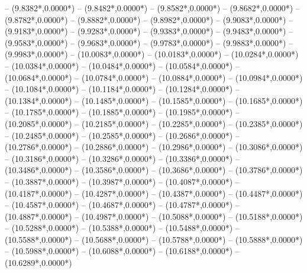 {	-- ({9.8382*\dx},{0.0000*\dy})
	-- ({9.8482*\dx},{0.0000*\dy})
	-- ({9.8582*\dx},{0.0000*\dy})
	-- ({9.8682*\dx},{0.0000*\dy})
	-- ({9.8782*\dx},{0.0000*\dy})
	-- ({9.8882*\dx},{0.0000*\dy})
	-- ({9.8982*\dx},{0.0000*\dy})
	-- ({9.9083*\dx},{0.0000*\dy})
	-- ({9.9183*\dx},{0.0000*\dy})
	-- ({9.9283*\dx},{0.0000*\dy})
	-- ({9.9383*\dx},{0.0000*\dy})
	-- ({9.9483*\dx},{0.0000*\dy})
	-- ({9.9583*\dx},{0.0000*\dy})
	-- ({9.9683*\dx},{0.0000*\dy})
	-- ({9.9783*\dx},{0.0000*\dy})
	-- ({9.9883*\dx},{0.0000*\dy})
	-- ({9.9983*\dx},{0.0000*\dy})
	-- ({10.0083*\dx},{0.0000*\dy})
	-- ({10.0183*\dx},{0.0000*\dy})
	-- ({10.0284*\dx},{0.0000*\dy})
	-- ({10.0384*\dx},{0.0000*\dy})
	-- ({10.0484*\dx},{0.0000*\dy})
	-- ({10.0584*\dx},{0.0000*\dy})
	-- ({10.0684*\dx},{0.0000*\dy})
	-- ({10.0784*\dx},{0.0000*\dy})
	-- ({10.0884*\dx},{0.0000*\dy})
	-- ({10.0984*\dx},{0.0000*\dy})
	-- ({10.1084*\dx},{0.0000*\dy})
	-- ({10.1184*\dx},{0.0000*\dy})
	-- ({10.1284*\dx},{0.0000*\dy})
	-- ({10.1384*\dx},{0.0000*\dy})
	-- ({10.1485*\dx},{0.0000*\dy})
	-- ({10.1585*\dx},{0.0000*\dy})
	-- ({10.1685*\dx},{0.0000*\dy})
	-- ({10.1785*\dx},{0.0000*\dy})
	-- ({10.1885*\dx},{0.0000*\dy})
	-- ({10.1985*\dx},{0.0000*\dy})
	-- ({10.2085*\dx},{0.0000*\dy})
	-- ({10.2185*\dx},{0.0000*\dy})
	-- ({10.2285*\dx},{0.0000*\dy})
	-- ({10.2385*\dx},{0.0000*\dy})
	-- ({10.2485*\dx},{0.0000*\dy})
	-- ({10.2585*\dx},{0.0000*\dy})
	-- ({10.2686*\dx},{0.0000*\dy})
	-- ({10.2786*\dx},{0.0000*\dy})
	-- ({10.2886*\dx},{0.0000*\dy})
	-- ({10.2986*\dx},{0.0000*\dy})
	-- ({10.3086*\dx},{0.0000*\dy})
	-- ({10.3186*\dx},{0.0000*\dy})
	-- ({10.3286*\dx},{0.0000*\dy})
	-- ({10.3386*\dx},{0.0000*\dy})
	-- ({10.3486*\dx},{0.0000*\dy})
	-- ({10.3586*\dx},{0.0000*\dy})
	-- ({10.3686*\dx},{0.0000*\dy})
	-- ({10.3786*\dx},{0.0000*\dy})
	-- ({10.3887*\dx},{0.0000*\dy})
	-- ({10.3987*\dx},{0.0000*\dy})
	-- ({10.4087*\dx},{0.0000*\dy})
	-- ({10.4187*\dx},{0.0000*\dy})
	-- ({10.4287*\dx},{0.0000*\dy})
	-- ({10.4387*\dx},{0.0000*\dy})
	-- ({10.4487*\dx},{0.0000*\dy})
	-- ({10.4587*\dx},{0.0000*\dy})
	-- ({10.4687*\dx},{0.0000*\dy})
	-- ({10.4787*\dx},{0.0000*\dy})
	-- ({10.4887*\dx},{0.0000*\dy})
	-- ({10.4987*\dx},{0.0000*\dy})
	-- ({10.5088*\dx},{0.0000*\dy})
	-- ({10.5188*\dx},{0.0000*\dy})
	-- ({10.5288*\dx},{0.0000*\dy})
	-- ({10.5388*\dx},{0.0000*\dy})
	-- ({10.5488*\dx},{0.0000*\dy})
	-- ({10.5588*\dx},{0.0000*\dy})
	-- ({10.5688*\dx},{0.0000*\dy})
	-- ({10.5788*\dx},{0.0000*\dy})
	-- ({10.5888*\dx},{0.0000*\dy})
	-- ({10.5988*\dx},{0.0000*\dy})
	-- ({10.6088*\dx},{0.0000*\dy})
	-- ({10.6188*\dx},{0.0000*\dy})
	-- ({10.6289*\dx},{0.0000*\dy})
}
